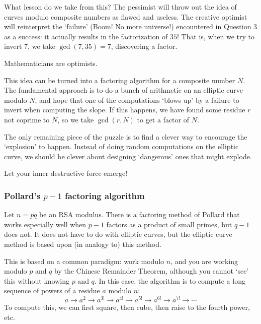 \documentclass{article}
\theoremstyle{plain}
\theoremstyle{definition}
\theoremstyle{remark}
\numberwithin{theorem}{section}
\begin{document}
What lesson do we take from this?  The pessimist will  throw out the idea of curves modulo composite numbers as flawed and useless.  The creative optimist will reinterpret the `failure' (Boom!  No more universe!) encountered in Question 3 as a success:  it actually results in the factorization of $35$!  That is, when we try to invert $7$, we take $\gcd(7,35) = 7$, discovering a factor.

Mathematicians are optimists.

This idea can be turned into a factoring algorithm for a composite number $N$.  The fundamental approach is to do a bunch of arithmetic on an elliptic curve modulo $N$, and hope that one of the computations `blows up' by a failure to invert when computing the slope.  If this happens, we have found some residue $r$ not coprime to $N$, so we take $\gcd(r,N)$ to get a factor of $N$.

The only remaining piece of the puzzle is to find a clever way to encourage the `explosion' to happen.  Instead of doing random computations on the elliptic curve, we should be clever about designing `dangerous' ones that might explode.

Let your inner destructive force emerge!

\subsubsection{Pollard's $p-1$ factoring algorithm}

Let $n = pq$ be an RSA modulus.  There is a factoring method of Pollard that works especially well when $p-1$ factors as a product of small primes, but $q-1$ does not.  It does not have to do with elliptic curves, but the elliptic curve method is based upon (in analogy to) this method.

This is based on a common paradigm:  work modulo $n$, and you are working modulo $p$ and $q$ by the Chinese Remainder Theorem, although you cannot `see' this without knowing $p$ and $q$.  In this case, the algorithm is to compute a long sequence of powers of a residue $a$ modulo $n$:
\begin{equation}
    \label{eqn:p-1seq}
a \rightarrow a^2 
\rightarrow a^{3!}
\rightarrow a^{4!}
\rightarrow a^{5!}
\rightarrow a^{6!}
\rightarrow a^{7!}
\rightarrow \cdots
\end{equation}
To compute this, we can first square, then cube, then raise to the fourth power, etc.
\end{document}
